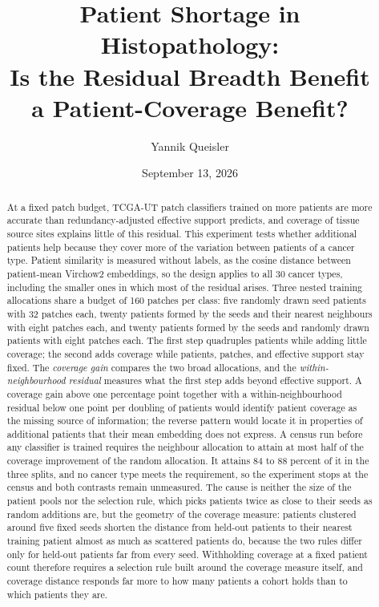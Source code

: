 \documentclass[11pt]{article}
\title{Patient Shortage in Histopathology:\\Is the Residual Breadth Benefit\\a Patient-Coverage Benefit?}
\author{Yannik Queisler}
\date{September 13, 2026}
\begin{document}
\raggedbottom
{}
\setlength{\emergencystretch}{2em}
\maketitle
\begin{abstract}
\noindent At a fixed patch budget, TCGA-UT patch classifiers trained on more patients are more accurate than redundancy-adjusted effective support predicts, and coverage of tissue source sites explains little of this residual. This experiment tests whether additional patients help because they cover more of the variation between patients of a cancer type. Patient similarity is measured without labels, as the cosine distance between patient-mean Virchow2 embeddings, so the design applies to all 30 cancer types, including the smaller ones in which most of the residual arises. Three nested training allocations share a budget of 160 patches per class: five randomly drawn seed patients with 32 patches each, twenty patients formed by the seeds and their nearest neighbours with eight patches each, and twenty patients formed by the seeds and randomly drawn patients with eight patches each. The first step quadruples patients while adding little coverage; the second adds coverage while patients, patches, and effective support stay fixed. The \emph{coverage gain} compares the two broad allocations, and the \emph{within-neighbourhood residual} measures what the first step adds beyond effective support. A coverage gain above one percentage point together with a within-neighbourhood residual below one point per doubling of patients would identify patient coverage as the missing source of information; the reverse pattern would locate it in properties of additional patients that their mean embedding does not express. A census run before any classifier is trained requires the neighbour allocation to attain at most half of the coverage improvement of the random allocation. It attains 84 to 88 percent of it in the three splits, and no cancer type meets the requirement, so the experiment stops at the census and both contrasts remain unmeasured. The cause is neither the size of the patient pools nor the selection rule, which picks patients twice as close to their seeds as random additions are, but the geometry of the coverage measure: patients clustered around five fixed seeds shorten the distance from held-out patients to their nearest training patient almost as much as scattered patients do, because the two rules differ only for held-out patients far from every seed. Withholding coverage at a fixed patient count therefore requires a selection rule built around the coverage measure itself, and coverage distance responds far more to how many patients a cohort holds than to which patients they are.
\end{abstract}
\setcounter{tocdepth}{1}
\tableofcontents
\clearpage
\end{document}
